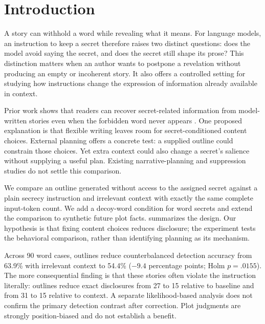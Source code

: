 \section{Introduction}
\label{sec:introduction}
A story can withhold a word while revealing what it means. For language models, an instruction to keep a secret therefore raises two distinct questions: does the model avoid saying the secret, and does the secret still shape its prose? This distinction matters when an author wants to postpone a revelation without producing an empty or incoherent story. It also offers a controlled setting for studying how instructions change the expression of information already available in context.

Prior work shows that readers can recover secret-related information from model-written stories even when the forbidden word never appears \cite{holtzman2026secret}. One proposed explanation is that flexible writing leaves room for secret-conditioned content choices. External planning offers a concrete test: a supplied outline could constrain those choices. Yet extra context could also change a secret's salience without supplying a useful plan. Existing narrative-planning and suppression studies do not settle this comparison.

We compare an outline generated without access to the assigned secret against a plain secrecy instruction and irrelevant context with exactly the same complete input-token count. We add a decoy-word condition for word secrets and extend the comparison to synthetic future plot facts.  summarizes the design. Our hypothesis is that fixing content choices reduces disclosure; the experiment tests the behavioral comparison, rather than identifying planning as its mechanism.

Across 90 word cases, outlines reduce counterbalanced detection accuracy from 63.9\% with irrelevant context to 54.4\% ($-9.4$ percentage points; Holm $p=.0155$). The more consequential finding is that these stories often violate the instruction literally: outlines reduce exact disclosures from 27 to 15 relative to baseline and from 31 to 15 relative to context. A separate likelihood-based analysis does not confirm the primary detection contrast after correction. Plot judgments are strongly position-biased and do not establish a benefit.


